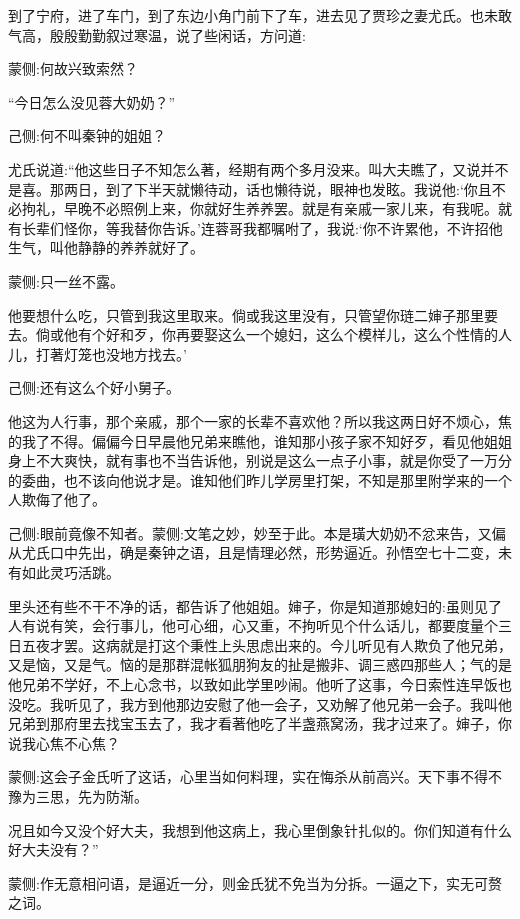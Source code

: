 \begin{parag}
    到了宁府，进了车门，到了东边小角门前下了车，进去见了贾珍之妻尤氏。也未敢气高，殷殷勤勤叙过寒温，说了些闲话，方问道:\begin{note}蒙侧:何故兴致索然？\end{note}“今日怎么没见蓉大奶奶？”\begin{note}己侧:何不叫秦钟的姐姐？\end{note}尤氏说道:“他这些日子不知怎么著，经期有两个多月没来。叫大夫瞧了，又说并不是喜。那两日，到了下半天就懒待动，话也懒待说，眼神也发眩。我说他:‘你且不必拘礼，早晚不必照例上来，你就好生养养罢。就是有亲戚一家儿来，有我呢。就有长辈们怪你，等我替你告诉。’连蓉哥我都嘱咐了，我说:‘你不许累他，不许招他生气，叫他静静的养养就好了。\begin{note}蒙侧:只一丝不露。\end{note}他要想什么吃，只管到我这里取来。倘或我这里没有，只管望你琏二婶子那里要去。倘或他有个好和歹，你再要娶这么一个媳妇，这么个模样儿，这么个性情的人儿，打著灯笼也没地方找去。’\begin{note}己侧:还有这么个好小舅子。\end{note}他这为人行事，那个亲戚，那个一家的长辈不喜欢他？所以我这两日好不烦心，焦的我了不得。偏偏今日早晨他兄弟来瞧他，谁知那小孩子家不知好歹，看见他姐姐身上不大爽快，就有事也不当告诉他，别说是这么一点子小事，就是你受了一万分的委曲，也不该向他说才是。谁知他们昨儿学房里打架，不知是那里附学来的一个人欺侮了他了。\begin{note}己侧:眼前竟像不知者。蒙侧:文笔之妙，妙至于此。本是璜大奶奶不忿来告，又偏从尤氏口中先出，确是秦钟之语，且是情理必然，形势逼近。孙悟空七十二变，未有如此灵巧活跳。\end{note}里头还有些不干不净的话，都告诉了他姐姐。婶子，你是知道那媳妇的:虽则见了人有说有笑，会行事儿，他可心细，心又重，不拘听见个什么话儿，都要度量个三日五夜才罢。这病就是打这个秉性上头思虑出来的。今儿听见有人欺负了他兄弟，又是恼，又是气。恼的是那群混帐狐朋狗友的扯是搬非、调三惑四那些人；气的是他兄弟不学好，不上心念书，以致如此学里吵闹。他听了这事，今日索性连早饭也没吃。我听见了，我方到他那边安慰了他一会子，又劝解了他兄弟一会子。我叫他兄弟到那府里去找宝玉去了，我才看著他吃了半盏燕窝汤，我才过来了。婶子，你说我心焦不心焦？\begin{note}蒙侧:这会子金氏听了这话，心里当如何料理，实在悔杀从前高兴。天下事不得不豫为三思，先为防渐。\end{note}况且如今又没个好大夫，我想到他这病上，我心里倒象针扎似的。你们知道有什么好大夫没有？”\begin{note}蒙侧:作无意相问语，是逼近一分，则金氏犹不免当为分拆。一逼之下，实无可赘之词。\end{note}
\end{parag}



